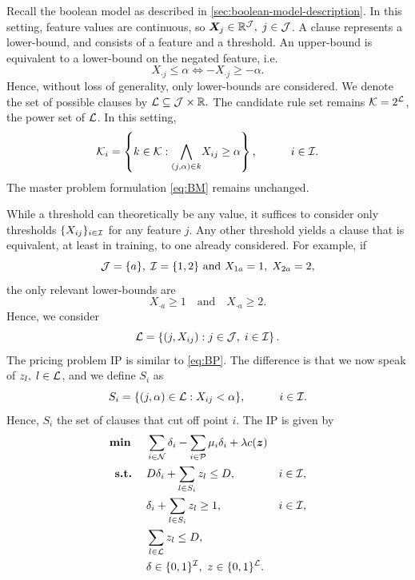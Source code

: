 Recall the boolean model as described in \autoref{sec:boolean-model-description}.
In this setting, feature values are continuous, so $\bm{X}_j \in \mathbb{R}^{\mathcal{J}}, \; j \in \mathcal{J}$.
A clause represents a lower-bound, and consists of a feature and a threshold.
An upper-bound is equivalent to a lower-bound on the negated feature, i.e.
\[X_{\cdot j} \leq \alpha \iff -X_{\cdot j} \geq -\alpha.\]
Hence, without loss of generality, only lower-bounds are considered.
We denote the set of possible clauses by $\mathcal{L} \subseteq \mathcal{J} \times \mathbb{R}.$
The candidate rule set remains $\mathcal{K} = 2^{\mathcal{L}}$, the power set of $\mathcal{L}$.
In this setting,
\begin{equation}
    \mathcal{K}_i = \left\{k \in \mathcal{K} : \underset{(j,\alpha) \in k}{\bigwedge} X_{ij} \geq \alpha\right\}, \quad \quad \quad i \in \mathcal{I}. \label{eq:threshold_K_i}
\end{equation}
The master problem formulation \eqref{eq:BM} remains unchanged.

While a threshold can theoretically be any value,
it suffices to consider only thresholds $\{X_{ij}\}_{i \in \mathcal{I}}$ for any feature $j$.
Any other threshold yields a clause that is equivalent, at least in training, to one already considered.
For example, if \[\mathcal{J} = \{a\},\; \mathcal{I}=\{1,2\} \text{ and } X_{1 a} = 1, \; X_{2 a} = 2,\] the only relevant lower-bounds are
\[X_{\cdot a} \geq 1 \quad \text{and} \quad X_{\cdot a} \geq 2.\]
Hence, we consider
\begin{equation}
    \mathcal{L} = \left\{\left(j, X_{ij}\right) : j \in \mathcal{J}, \; i \in \mathcal{I}\right\}.\label{eq:threshold_L_full}
\end{equation}
The pricing problem IP is similar to \eqref{eq:BP}.
The difference is that we now speak of $z_l, \; l \in \mathcal{L}$, and we define $S_i$ as
\begin{equation}\label{eq:S_i_threshold}
    S_i = \{(j,\alpha) \in \mathcal{L} : X_{ij} < \alpha\}, \quad \quad \quad i \in \mathcal{I}.
\end{equation}
Hence, $S_i$ the set of clauses that cut off point $i$.
The IP is given by
\begin{subequations}
    \label{eq:TP}
    \begin{align}
        \min \quad & \sum_{i \in \cN} \delta_i - \sum_{i \in \cP} \mu_i \delta_i +
        \lambda c(\bm{z}) \label{eq:TP-obj} \\
        \st \quad & D\delta_i + \sum_{l \in S_i} z_l \leq D, & i \in \I, \label{eq:TP-con1}\\
        & \delta_i +  \sum_{l \in S_i} z_l \geq  1, & i \in \I,  \label{eq:TP-con2}\\
        & \sum_{l \in \L} z_l \leq D, \quad \label{eq:TP-complex}\\
        & \mathrlap{\delta\in \{0,1\}^\I,~z\in\{0,1\}^{\cL}.}\label{eq:TP-vars}
    \end{align}
\end{subequations}

